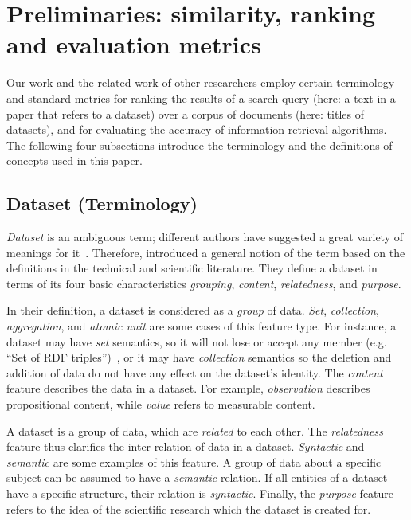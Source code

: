 \documentclass{IOS-Book-Article}
\begin{document}
\section{Preliminaries: similarity, ranking and evaluation metrics}
\label{sec:preliminaries}
Our work and the related work of other researchers employ certain terminology and standard metrics for ranking the results of a search query (here: a text in a paper that refers to a dataset) over a corpus of documents (here: titles of datasets), and for evaluating the accuracy of information retrieval algorithms.
The following four subsections introduce the terminology and the definitions of concepts used in this paper.

\subsection{Dataset (Terminology)}
\emph{Dataset} is an ambiguous term; different authors have suggested a great variety of meanings for it~\cite{peplerpreservation}.
Therefore, \citeauthor{renear2010definitions} introduced a general notion of the term based on the definitions in the technical and scientific literature.
They define a dataset in terms of its four basic characteristics \emph{grouping}, \emph{content}, \emph{relatedness}, and \emph{purpose}.

In their definition, a dataset is considered as a \emph{group} of data.  \emph{Set}, \emph{collection}, \emph{aggregation}, and \emph{atomic unit} are some cases of this feature type.
For instance, a dataset may have \emph{set} semantics, so it will not lose or accept any member (e.g. “Set of RDF triples”)~\cite{renear2010definitions}, or it may have \emph{collection} semantics so the deletion and addition of data do not have any effect on the dataset's identity.
The \emph{content} feature describes the data in a dataset.
For example, \emph{observation} describes propositional content, while \emph{value} refers to measurable content.

A dataset is a group of data, which are \emph{related} to each other.
The \emph{relatedness} feature thus clarifies the inter-relation of data in a dataset.
\emph{Syntactic} and \emph{semantic} are some examples of this feature.   
A group of data about a specific subject can be assumed to have a \emph{semantic} relation.
If all entities of a dataset have a specific structure, their relation is \emph{syntactic}.
Finally, the \emph{purpose} feature refers to the idea of the scientific research which the dataset is created for.
\end{document}
